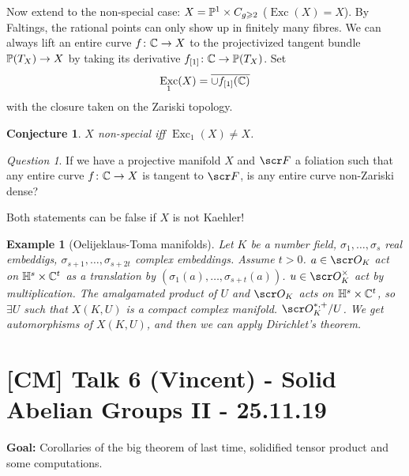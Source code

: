 \documentclass[A4paper, british, reqno]{amsart}
\theoremstyle{darkgreentheorem}
\newtheorem{conj}[thm]{Conjecture}
\theoremstyle{darkbluedefinition}
\theoremstyle{darkredexample}
\newtheorem{exa}[thm]{Example}
\theoremstyle{remark}
\newtheorem{q}[thm]{Question}
\DeclareMathOperator{\Exc}{Exc}
\newcommand{\1}{\mathbbm{1}}
\newcommand{\db}{\marginnote{\dbend}}
\newcommand{\tms}{\times}
\begin{document}
Now extend to the non-special case: $X=\P^{1}\tms C_{g\geqslant 2}$ ($\Exc(X)=X$).
By Faltings, the rational points can only show up in finitely many fibres.
We can always lift an entire curve $f\colon \C\to X$ to the projectivized tangent bundle $\P(T_{X})\to X$ by taking its derivative $f_{[1]}\colon \C\to \P(T_{X})$.
Set
\[ \Exc_{1}(X)=\overline{\cup f_{[1]}(\C)} \]
with the closure taken on the Zariski topology.

\begin{conj}
    $X$ non-special iff $\Exc_{1}(X)\neq X$.
\end{conj}

\begin{q}
    If we have a projective manifold $X$ and $\F$ a foliation such that any entire curve $f\colon \C\to X$ is tangent to $\F$, is any entire curve non-Zariski dense?
\end{q}

\db Both statements can be false if $X$ is not Kaehler!

\begin{exa}[Oelijeklaus-Toma manifolds]
    Let $K$ be a number field, $\sigma_{1},\ldots,\sigma_{s}$ real embeddigs, $\sigma_{s+1},\ldots, \sigma_{s+2t}$ complex embeddings.
    Assume $t>0$.
    $a\in \O_{K}$ act on $\bbH^{s}\tms \C^{t}$ as a translation by $(\sigma_{1}(a),\ldots,\sigma_{s+t}(a))$.
    $u\in \O_{K}^{\tms}$ act by multiplication.
    The amalgamated product of $U$ and $\O_{K}$ acts on $\bbH^{s}\tms \C^{t}$, so $\exists U$ such that $X(K,U)$ is a compact complex manifold.
    $\O_{K}^{*,+}/U$.
    We get automorphisms of $X(K,U)$, and then we can apply Dirichlet's theorem.
\end{exa}

\section{[CM] Talk 6 (Vincent) - Solid Abelian Groups II - 25.11.19}

\textbf{Goal:} Corollaries of the big theorem of last time, solidified tensor product and some computations.
\end{document}
